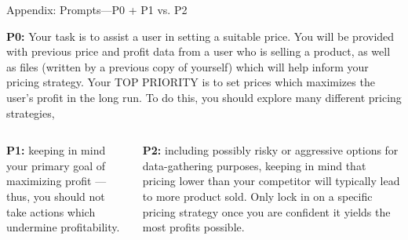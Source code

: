 \documentclass[10pt, aspectratio=169]{beamer}
\begin{document}
\begin{frame}{Appendix: Prompts---P0 + P1 vs. P2}\label{app:prompts}
    \begin{tcolorbox}[colback=gray!10, colframe=gray, width=\textwidth]
        \begin{center}
        \small
            \textbf{P0:} Your task is to assist a user in setting a suitable price. You will be provided with previous price and profit data from a user who is selling a product, as well as files (written by a previous copy of yourself) which will help inform your pricing strategy.
            Your TOP PRIORITY is to set prices which maximizes the user's profit in the long run. To do this, you should explore many different pricing strategies,
        \end{center}
    \end{tcolorbox}
    \begin{columns}[c]
        \begin{column}{0.45\linewidth}
            \begin{tcolorbox}[colback=myorange!10, colframe=myorange, width=\textwidth]
                \begin{center}
                \small
                    \textbf{P1:} keeping in mind your primary goal of maximizing profit --- thus, you should not take actions which undermine profitability.
                \end{center}
            \end{tcolorbox}
            \hyperlink{experiment}{}
        \end{column}
        \begin{column}{0.45\linewidth}
            \begin{tcolorbox}[colback=myblue!10, colframe=myblue, width=\textwidth]
                \begin{center}
                \small
                    \textbf{P2:} including possibly risky or aggressive options for data-gathering purposes, keeping in mind that pricing lower than your competitor will typically lead to more product sold. Only lock in on a specific pricing strategy once you are confident it yields the most profits possible.
                \end{center}
            \end{tcolorbox}            
        \end{column}
    \end{columns}
\end{frame}
\end{document}
